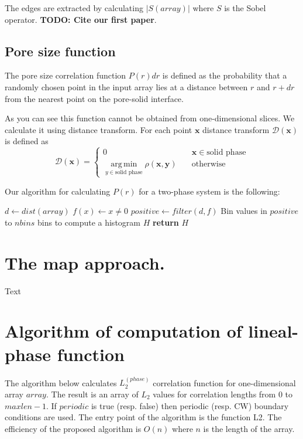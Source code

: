 \documentclass[reprint,amsmath,amssymb,aps,pre]{revtex4-1}
\DeclareMathOperator*{\argmin}{arg\,min}
\begin{document}
The edges are extracted by calculating $|S(array)|$ where $S$ is the Sobel
operator. \textbf{TODO: Cite our first paper}.

\subsection{Pore size function}
The pore size correlation function $P(r)dr$ is defined as the probability that a
randomly chosen point in the input array lies at a distance between
$r$ and $r + dr$ from the nearest point on the pore-solid interface.

As you can see this function cannot be obtained from one-dimensional slices. We
calculate it using distance transform. For each point $\bm{x}$ distance
transform $\mathcal{D}(\bm{x})$ is defined as
\begin{equation*}
  \mathcal{D}(\bm{x})= \left\{
  \begin{array}{ll}
    0 & \quad \bm{x} \in \text{solid phase} \\
    \argmin\limits_{y \in \text{solid phase}} \rho(\bm{x},\bm{y}) & \quad \text{otherwise}
  \end{array}
\right.
\end{equation*}

Our algorithm for calculating $P(r)$ for a two-phase system is the following:
\begin{algorithmic}[1]
    \State $d \gets dist(array)$ 
    \State $f(x) \gets x \ne 0$
    \State $positive \gets filter(d, f)$
    \State Bin values in $positive$ to $nbins$ bins to compute a histogram $H$
    \State \textbf{return} $H$
  \EndProcedure
\end{algorithmic}

\section{The map approach.}
\label{mapsec}
Text

\appendix
\section{Algorithm of computation of lineal-phase function}
\label{linpathalg}
The algorithm below calculates $L_2^{(phase)}$ correlation function for
one-dimensional array $array$. The result is an array of $L_2$ values for
correlation lengths from $0$ to $maxlen-1$. If $periodic$ is true (resp. false)
then periodic (resp. CW) boundary conditions are used. The entry point of the
algorithm is the function L2. The efficiency of the proposed algorithm is $O(n)$
where $n$ is the length of the array.
\end{document}
